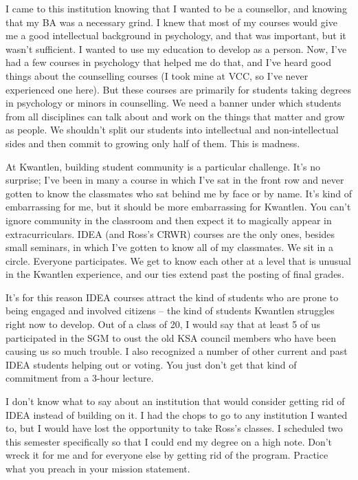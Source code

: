 \documentclass[letterpaper,10pt,headsepline]{scrreprt}
\begin{document}
I came to this institution knowing that I wanted to be a counsellor, and knowing that my BA was a necessary grind. I knew that most of my courses would give me a good intellectual background in psychology, and that was important, but it wasn't sufficient. I wanted to use my education to develop as a person. Now, I've had a few courses in psychology that helped me do that, and I've heard good things about the counselling courses (I took mine at VCC, so I've never experienced one here). But these courses are primarily for students taking degrees in psychology or minors in counselling. We need a banner under which students from all disciplines can talk about and work on the things that matter and grow as people. We shouldn't split our students into intellectual and non-intellectual sides and then commit to growing only half of them. This is madness.

At Kwantlen, building student community is a particular challenge. It's no surprise; I've been in many a course in which I've sat in the front row and never gotten to know the classmates who sat behind me by face or by name. It's kind of embarrassing for me, but it should be more embarrassing for Kwantlen. You can't ignore community in the classroom and then expect it to magically appear in extracurriculars. IDEA (and Ross's CRWR) courses are the only ones, besides small seminars, in which I've gotten to know all of my classmates. We sit in a circle. Everyone participates. We get to know each other at a level that is unusual in the Kwantlen experience, and our ties extend past the posting of final grades.

It's for this reason IDEA courses attract the kind of students who are prone to being engaged and involved citizens -- the kind of students Kwantlen struggles right now to develop. Out of a class of 20, I would say that at least 5 of us participated in the SGM to oust the old KSA council members who have been causing us so much trouble. I also recognized a number of other current and past IDEA students helping out or voting. You just don't get that kind of commitment from a 3-hour lecture.

I don't know what to say about an institution that would consider getting rid of IDEA instead of building on it. I had the chops to go to any institution I wanted to, but I would have lost the opportunity to take Ross's classes. I scheduled two this semester specifically so that I could end my degree on a high note. Don't wreck it for me and for everyone else by getting rid of the program. Practice what you preach in your mission statement.
\end{document}
